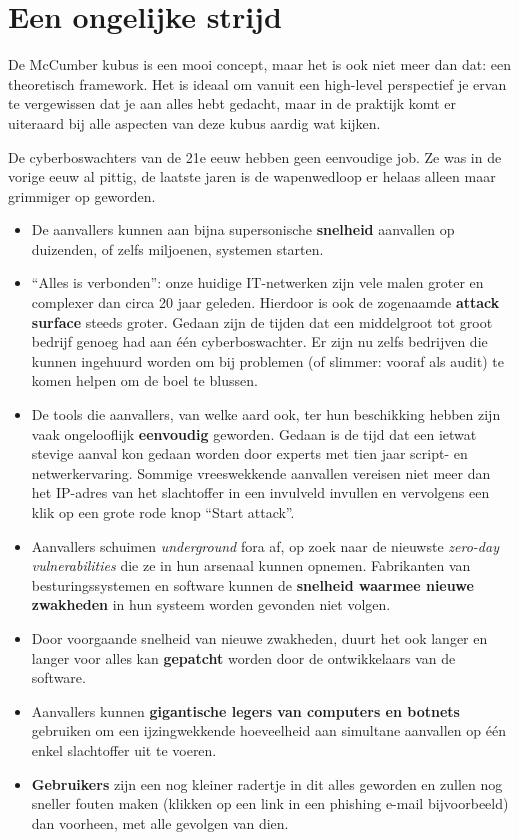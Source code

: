 \documentclass[
  10pt,
  dutch,
  paper=a4,
  ,captions=tableheading
]{scrbook}
\providecommand{\tightlist}{%
  \setlength{\itemsep}{0pt}\setlength{\parskip}{0pt}}
\begin{document}
\section{Een ongelijke strijd}\label{een-ongelijke-strijd}

De McCumber kubus is een mooi concept, maar het is ook niet meer dan
dat: een theoretisch framework. Het is ideaal om vanuit een high-level
perspectief je ervan te vergewissen dat je aan alles hebt gedacht, maar
in de praktijk komt er uiteraard bij alle aspecten van deze kubus aardig
wat kijken.

De cyberboswachters van de 21e eeuw hebben geen eenvoudige job. Ze was
in de vorige eeuw al pittig, de laatste jaren is de wapenwedloop er
helaas alleen maar grimmiger op geworden.

\begin{itemize}
\tightlist
\item
  De aanvallers kunnen aan bijna supersonische \textbf{snelheid}
  aanvallen op duizenden, of zelfs miljoenen, systemen starten.
\item
  ``Alles is verbonden'': onze huidige IT-netwerken zijn vele malen
  groter en complexer dan circa 20 jaar geleden. Hierdoor is ook de
  zogenaamde \textbf{attack surface} steeds groter. Gedaan zijn de
  tijden dat een middelgroot tot groot bedrijf genoeg had aan één
  cyberboswachter. Er zijn nu zelfs bedrijven die kunnen ingehuurd
  worden om bij problemen (of slimmer: vooraf als audit) te komen helpen
  om de boel te blussen.
\item
  De tools die aanvallers, van welke aard ook, ter hun beschikking
  hebben zijn vaak ongelooflijk \textbf{eenvoudig} geworden. Gedaan is
  de tijd dat een ietwat stevige aanval kon gedaan worden door experts
  met tien jaar script- en netwerkervaring. Sommige vreeswekkende
  aanvallen vereisen niet meer dan het IP-adres van het slachtoffer in
  een invulveld invullen en vervolgens een klik op een grote rode knop
  ``Start attack''.
\item
  Aanvallers schuimen \emph{underground} fora af, op zoek naar de
  nieuwste \emph{zero-day vulnerabilities} die ze in hun arsenaal kunnen
  opnemen. Fabrikanten van besturingssystemen en software kunnen de
  \textbf{snelheid waarmee nieuwe zwakheden} in hun systeem worden
  gevonden niet volgen.
\item
  Door voorgaande snelheid van nieuwe zwakheden, duurt het ook langer en
  langer voor alles kan \textbf{gepatcht} worden door de ontwikkelaars
  van de software.
\item
  Aanvallers kunnen \textbf{gigantische legers van computers en botnets}
  gebruiken om een ijzingwekkende hoeveelheid aan simultane aanvallen op
  één enkel slachtoffer uit te voeren.
\item
  \textbf{Gebruikers} zijn een nog kleiner radertje in dit alles
  geworden en zullen nog sneller fouten maken (klikken op een link in
  een phishing e-mail bijvoorbeeld) dan voorheen, met alle gevolgen van
  dien.
\end{itemize}
\end{document}
